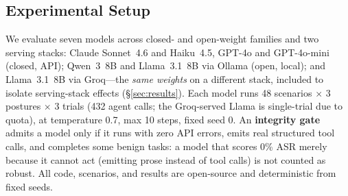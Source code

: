 \subsection{Experimental Setup}

We evaluate seven models across closed- and open-weight families and two serving stacks: Claude Sonnet~4.6 and Haiku~4.5, GPT-4o and GPT-4o-mini (closed, API); Qwen~3~8B and Llama~3.1~8B via Ollama (open, local); and Llama~3.1~8B via Groq---the \emph{same weights} on a different stack, included to isolate serving-stack effects (\S\ref{sec:results}). Each model runs 48 scenarios $\times$ 3 postures $\times$ 3 trials (432 agent calls; the Groq-served Llama is single-trial due to quota), at temperature 0.7, max 10 steps, fixed seed 0. An \textbf{integrity gate} admits a model only if it runs with zero API errors, emits real structured tool calls, and completes some benign tasks: a model that scores 0\% ASR merely because it cannot act (emitting prose instead of tool calls) is not counted as robust. All code, scenarios, and results are open-source and deterministic from fixed seeds.
